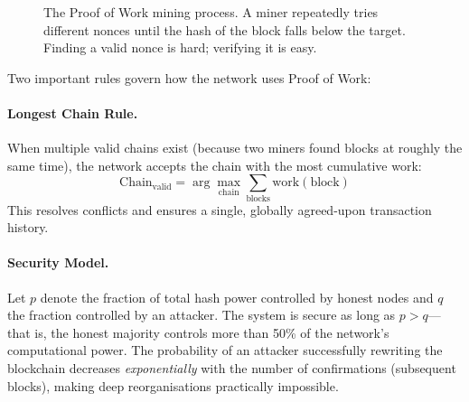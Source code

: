 \begin{figure}[htbp]
\centering
{}
\caption{The Proof of Work mining process. A miner repeatedly tries different nonces until the hash of the block falls below the target. Finding a valid nonce is hard; verifying it is easy.}
\label{fig:pow-mining}
\end{figure}

Two important rules govern how the network uses Proof of Work:

\paragraph{Longest Chain Rule.} When multiple valid chains exist (because two miners found blocks at roughly the same time), the network accepts the chain with the most cumulative work:
\begin{equation}
    \text{Chain}_{\text{valid}} = \arg\max_{\text{chain}} \sum_{\text{blocks}} \text{work}(\text{block})
    \label{eq:longest-chain}
\end{equation}
This resolves conflicts and ensures a single, globally agreed-upon transaction history.

\paragraph{Security Model.} Let $p$ denote the fraction of total hash power controlled by honest nodes and $q$ the fraction controlled by an attacker. The system is secure as long as $p > q$---that is, the honest majority controls more than 50\% of the network's computational power. The probability of an attacker successfully rewriting the blockchain decreases \emph{exponentially} with the number of confirmations (subsequent blocks), making deep reorganisations practically impossible.
